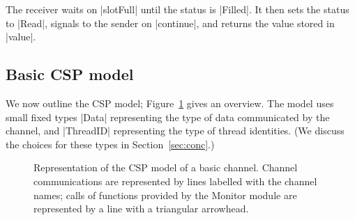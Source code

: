 The receiver waits on |slotFull| until the status is |Filled|.  It then sets
the status to |Read|, signals to the sender on |continue|, and returns the
value stored in |value|.


\subsection{Basic CSP model}

We now outline the CSP model; Figure~\ref{fig:basic-CSP-model} gives an
overview.  The model uses small fixed types |Data| representing the type of
data communicated by the channel, and |ThreadID| representing the type of
thread identities.  (We discuss the choices for these types in
Section~\ref{sec:conc}.)


\begin{figure}
\begin{center}
\def\gap{0.1}
\def\threadW{15mm}
\def\height{8mm}
\end{center}
\caption{Representation of the CSP model of a basic channel.  Channel
  communications are represented by lines labelled with the channel names;
  calls of functions provided by the {\cspmstyle Monitor} module are
  represented by a line with a triangular arrowhead.}
\label{fig:basic-CSP-model}
\end{figure}

